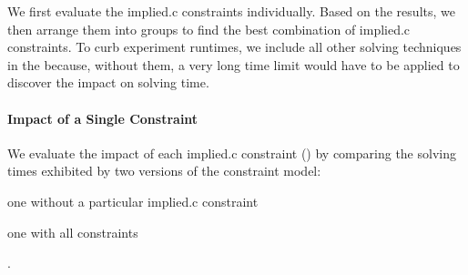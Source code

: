 \newsavebox{\solvTechPlot}
\newlength{\solvTechPlotW}
\newlength{\solvTechSubfigW}


We first evaluate the \gls{implied.c} \glspl{constraint} individually.
%
Based on the results, we then arrange them into groups to find the best
combination of \gls{implied.c} \glspl{constraint}.
%
To curb experiment runtimes, we include all other solving techniques in the
 because, without them, a very long time limit
would have to be applied to discover the impact on solving time.


\paragraph{Impact of a Single Constraint}

We evaluate the impact of each \gls{implied.c} \gls{constraint}
()
by comparing the solving times exhibited by two versions of the \gls{constraint
  model}:
%
\begin{modelList}
  \item {}
    one without a particular \gls{implied.c} \gls{constraint}
  \item {}
    one with all \glspl{constraint}
\end{modelList}.

